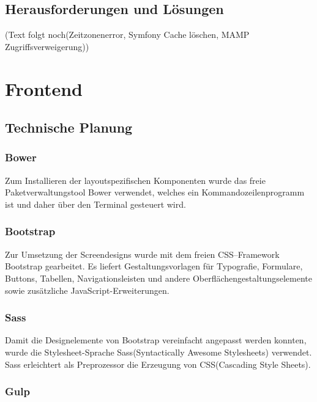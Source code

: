   \subsection{Herausforderungen und Lösungen}

(Text folgt noch(Zeitzonenerror, Symfony Cache löschen, MAMP Zugriffsverweigerung))
 
\section{Frontend}

  \subsection{Technische Planung}

    \subsubsection{Bower}

Zum Installieren der layoutspezifischen Komponenten wurde das freie Paketverwaltungstool Bower verwendet, welches ein Kommandozeilenprogramm ist und daher über den Terminal gesteuert wird. 
    
    \subsubsection{Bootstrap}

Zur Umsetzung der Screendesigns wurde mit dem freien CSS–Framework Bootstrap gearbeitet. Es liefert Gestaltungsvorlagen für Typografie, Formulare, Buttons, Tabellen, Navigationsleisten und andere Oberflächengestaltungselemente sowie zusätzliche JavaScript-Erweiterungen.

    \subsubsection{Sass}

Damit die Designelemente von Bootstrap vereinfacht angepasst werden konnten, wurde die Stylesheet-Sprache Sass(Syntactically Awesome Stylesheets) verwendet. Sass erleichtert als Preprozessor die Erzeugung von CSS(Cascading Style Sheets). 

    \subsubsection{Gulp}

